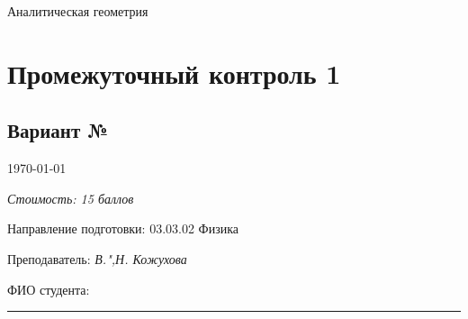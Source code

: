 \documentclass[a4paper, 12pt]{article}
\begin{document}
\thispagestyle{empty}
\vspace{-10ex}

\begin{center}
	\Huge{Аналитическая геометрия}\\
	\vspace{-3ex}
	\section*{Промежуточный контроль 1}
	\vspace{-2ex}
	\subsection*{Вариант №} 
		\vspace{-1ex}
	\normalsize\today		
		
\end{center}
\vspace{-2ex}	
\textit{Стоимость: 15 баллов}
\begin{flushleft}
	Направление подготовки: 03.03.02 Физика
	
	Преподаватель: \textit{В.",Н. Кожухова}
	
	ФИО студента: \rule{\linewidth}{0.5 pt}	
\end{flushleft}	
\end{document}
